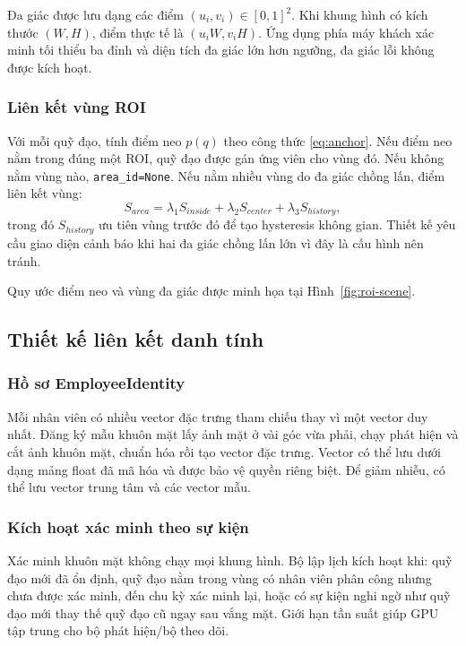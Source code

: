 Đa giác được lưu dạng các điểm $(u_i,v_i)\in[0,1]^2$. Khi khung hình có kích thước $(W,H)$, điểm thực tế là $(u_iW,v_iH)$. Ứng dụng phía máy khách xác minh tối thiểu ba đỉnh và diện tích đa giác lớn hơn ngưỡng, đa giác lỗi không được kích hoạt.

\subsubsection{Liên kết vùng ROI}
Với mỗi quỹ đạo, tính điểm neo $p(q)$ theo công thức \ref{eq:anchor}. Nếu điểm neo nằm trong đúng một ROI, quỹ đạo được gán ứng viên cho vùng đó. Nếu không nằm vùng nào, \texttt{area\_id=None}. Nếu nằm nhiều vùng do đa giác chồng lấn, điểm liên kết vùng:
\begin{equation}
 S_{area}=\lambda_1 S_{inside}+\lambda_2 S_{center}+\lambda_3 S_{history},
\end{equation}
trong đó $S_{history}$ ưu tiên vùng trước đó để tạo hysteresis không gian. Thiết kế yêu cầu giao diện cảnh báo khi hai đa giác chồng lấn lớn vì đây là cấu hình nên tránh.

Quy ước điểm neo và vùng đa giác được minh họa tại Hình~\ref{fig:roi-scene}.

\subsection{Thiết kế liên kết danh tính}
\subsubsection{Hồ sơ EmployeeIdentity}
Mỗi nhân viên có nhiều vector đặc trưng tham chiếu thay vì một vector duy nhất. Đăng ký mẫu khuôn mặt lấy ảnh mặt ở vài góc vừa phải, chạy phát hiện và cắt ảnh khuôn mặt, chuẩn hóa rồi tạo vector đặc trưng. Vector có thể lưu dưới dạng mảng float đã mã hóa và được bảo vệ quyền riêng biệt. Để giảm nhiễu, có thể lưu vector trung tâm và các vector mẫu.

\subsubsection{Kích hoạt xác minh theo sự kiện}
Xác minh khuôn mặt không chạy mọi khung hình. Bộ lập lịch kích hoạt khi: quỹ đạo mới đã ổn định, quỹ đạo nằm trong vùng có nhân viên phân công nhưng chưa được xác minh, đến chu kỳ xác minh lại, hoặc có sự kiện nghi ngờ như quỹ đạo mới thay thế quỹ đạo cũ ngay sau vắng mặt. Giới hạn tần suất giúp GPU tập trung cho bộ phát hiện/bộ theo dõi.


